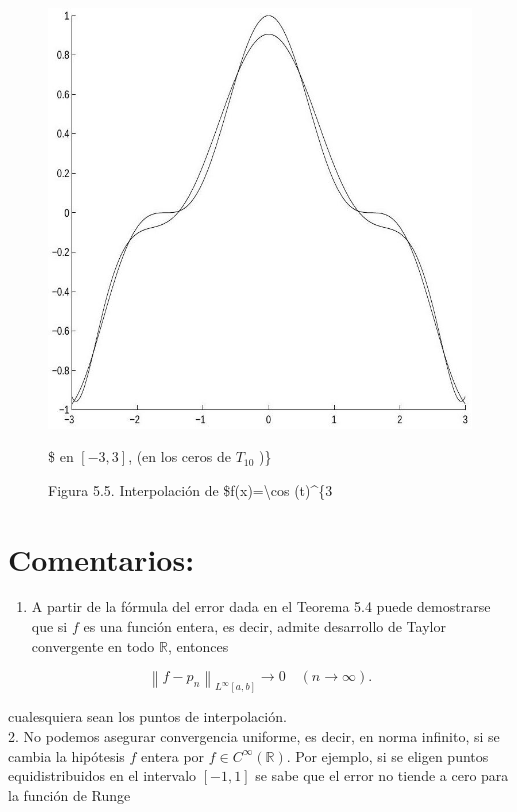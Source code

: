 \documentclass[10pt]{book}
\begin{document}
\begin{figure}[h]
\begin{center}
  \includegraphics[width=\textwidth]{2025_09_05_3888c9ac96bd653d96b4g-107}
\captionsetup{labelformat=empty}
\caption{Figura 5.5. Interpolación de \$f(x)=\textbackslash cos (t)\^{}\{3}\$ en $[-3,3]$, (en los ceros de $T_{10}$ )\}\end{center}
\end{figure}

\section*{Comentarios:}
\begin{enumerate}
  \item A partir de la fórmula del error dada en el Teorema 5.4 puede demostrarse que si $f$ es una función entera, es decir, admite desarrollo de Taylor convergente en todo $\mathbb{R}$, entonces
\end{enumerate}

$$
\left\|f-p_{n}\right\|_{L^{\infty}[a, b]} \rightarrow 0 \quad(n \rightarrow \infty) .
$$

cualesquiera sean los puntos de interpolación.\\
2. No podemos asegurar convergencia uniforme, es decir, en norma infinito, si se cambia la hipótesis $f$ entera por $f \in C^{\infty}(\mathbb{R})$. Por ejemplo, si se eligen puntos equidistribuidos en el intervalo $[-1,1]$ se sabe que el error no tiende a cero para la función de Runge
\end{document}
